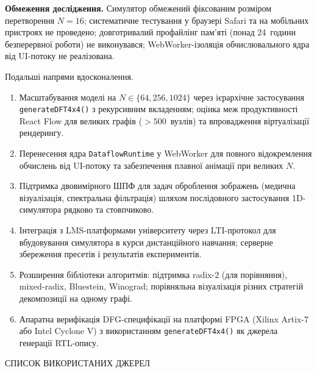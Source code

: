 \textbf{Обмеження дослідження.} Симулятор обмежений фіксованим розміром
перетворення \(N = 16\); систематичне тестування у браузері Safari та на
мобільних пристроях не проведено; довготривалий профайлінг пам'яті
(понад 24~години безперервної роботи) не виконувався; WebWorker-ізоляція
обчислювального ядра від UI-потоку не реалізована.

Подальші напрями вдосконалення.

\begin{enumerate}
\def\labelenumi{\arabic{enumi}.}
\item
  Масштабування моделі на \(N \in \{ 64,256,1024\}\) через ієрархічне
  застосування \texttt{generateDFT4x4()} з рекурсивним вкладенням;
  оцінка меж продуктивності React Flow для великих графів
  (\(> 500\)~вузлів) та впровадження віртуалізації рендерингу.
\item
  Перенесення ядра \texttt{DataflowRuntime} у WebWorker для повного
  відокремлення обчислень від UI-потоку та забезпечення плавної анімації
  при великих \(N\).
\item
  Підтримка двовимірного ШПФ для задач оброблення зображень (медична
  візуалізація, спектральна фільтрація) шляхом послідовного застосування
  1D-симулятора рядково та стовпчиково.
\item
  Інтеграція з LMS-платформами університету через LTI-протокол для
  вбудовування симулятора в курси дистанційного навчання; серверне
  збереження пресетів і результатів експериментів.
\item
  Розширення бібліотеки алгоритмів: підтримка radix-2 (для порівняння),
  mixed-radix, Bluestein, Winograd; порівняльна візуалізація різних
  стратегій декомпозиції на одному графі.
\item
  Апаратна верифікація DFG-специфікації на платформі FPGA (Xilinx
  Artix-7 або Intel Cyclone V) з використанням \texttt{generateDFT4x4()}
  як джерела генерації RTL-опису.
\end{enumerate}

\protect{}\label{_Toc228305380}{}СПИСОК ВИКОРИСТАНИХ ДЖЕРЕЛ

